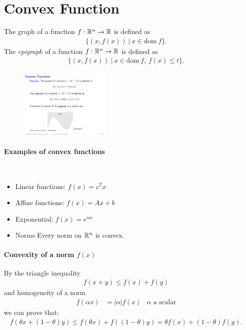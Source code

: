 \section{Convex Function}
The graph of a function $f:\mathbb{R}^n \rightarrow \mathbb{R}$ is defined as 
\begin{align*}
    \{
        (x,f(x))\ |\ x\in \text{dom}\ f
    \}.
\end{align*}
The \emph{epigraph} of a function $f:\mathbb{R}^n\rightarrow \mathbb{R}$ is defined as
\begin{align*}
    \{
        (x,f(x))\ |\ x\in \text{dom}\ f,\ f(x)\leq t
    \}.
\end{align*}
\begin{figure}[H]
\centering
\includegraphics[width=0.4\textwidth]{img/epigraph}
\end{figure}

\paragraph{Examples of convex functions} $\ $
\begin{itemize}
 \item Linear functions: $f(x) = c^T x$
 \item Affine functions: $f(x) = Ax+b$
 \item Exponential: $f(x) = e^{\alpha x}$
 \item Norms Every norm on $\mathbb{R}^n$ is convex.
\end{itemize}

\paragraph{Convexity of a norm $f(x)$} By the triangle inequality 
\begin{align*}
    f(x+y) \leq f(x) + f(y)
\end{align*}
and homogeneity of a norm 
\begin{align*}
    f(\alpha x) &= |\alpha| f(x) &\alpha \text{ a scalar}
\end{align*}
we can prove that:
\begin{align*}
    f(\theta x+(1-\theta)y)\leq f(\theta x)+f((1-\theta)y) = \theta f(x) + (1-\theta)f(y).
\end{align*}








